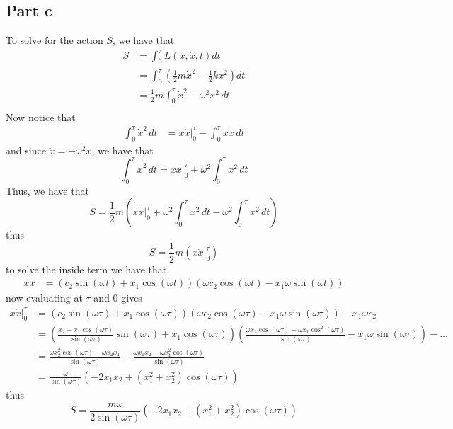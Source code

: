 \documentclass[12pt]{report}
\begin{document}
\subsection*{Part c}
To solve for the action $S$, we have that
\begin{align*}
  S &= \int_0^\tau L(x, \dot{x}, t) dt \\
    &= \int_0^\tau \left(\frac{1}{2}m\dot{x}^2 - \frac{1}{2}kx^2\right) dt \\
    &= \frac{1}{2}m\int_0^\tau \dot{x}^2 - \omega^2 x^2 \, dt \\ 
\end{align*}
Now notice that
\begin{align*}
  \int_0^\tau \dot{x}^2 \, dt &= x\dot{x}\Big|_0^\tau - \int_0^\tau x\ddot{x} \, dt 
\end{align*}
and since $\ddot{x} = -\omega^2 x$, we have that
\begin{equation*}
  \int_0^\tau \dot{x}^2 \, dt = x\dot{x}\Big|_0^\tau + \omega^2 \int_0^\tau x^2 \, dt
\end{equation*}
Thus, we have that
\begin{equation*}
  S = \frac{1}{2}m\left(x\dot{x}\Big|_0^\tau + \omega^2 \int_0^\tau x^2 \, dt - \omega^2 \int_0^\tau x^2 \, dt \right)
\end{equation*}
thus
\begin{equation*}
  S = \frac{1}{2}m\left(x\dot{x}\Big|_0^\tau\right)
\end{equation*}
to solve the inside term we have that
\begin{align*}
  x\dot{x} &= \left(c_2 \sin(\omega t) + x_1 \cos(\omega t)\right) (\omega c_2 \cos(\omega t) - x_1 \omega \sin(\omega t)) 
\end{align*}
now evaluating at $\tau$ and $0$ gives
\begin{align*}
  x\dot{x}\Big|_0^\tau &= \left(c_2 \sin(\omega \tau) + x_1 \cos(\omega \tau)\right) (\omega c_2 \cos(\omega \tau) - x_1 \omega \sin(\omega \tau))-  x_1\omega c_2 \\
                       &= \left(\frac{x_2 - x_1\cos(\omega \tau)}{\sin(\omega \tau)} \sin(\omega \tau) + x_1\cos(\omega \tau)\right) \left(\frac{\omega x_2\cos(\omega \tau)-\omega x_1 \cos^2(\omega \tau)}{\sin(\omega \tau)} - x_1 \omega \sin(\omega \tau)\right) - \dots \\
                       &= \frac{\omega x_2^2 \cos(\omega \tau) - \omega x_2x_1}{\sin(\omega \tau)} - \frac{\omega x_1x_2 - \omega x_1^2 \cos(\omega \tau)}{\sin(\omega \tau)} \\
                       &= \frac{\omega}{\sin(\omega \tau)}(-2x_1x_2 + (x_1^2 + x_2^2)\cos(\omega \tau))
\end{align*}
thus 
\begin{equation*}
  S = \frac{m\omega}{2\sin(\omega \tau)}(-2x_1x_2 + (x_1^2 + x_2^2)\cos(\omega \tau))
\end{equation*}
\end{document}

